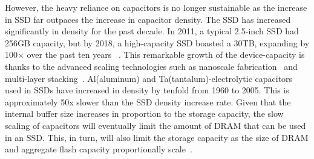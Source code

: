 
However, the heavy reliance on capacitors is no longer sustainable as the increase in SSD far outpaces 
the increase in capacitor density.
The SSD has increased significantly in density for the past decade. 
In 2011, a typical 2.5-inch SSD had 256GB capacity, but
by 2018, a high-capacity SSD boasted a 30TB, expanding by 100× over the past ten years
~\cite{samsung2011, anandtech18samsung}. 
This remarkable growth of the device-capacity is thanks to the advanced scaling technologies 
such as nanoscale fabrication~\cite{busche2014design} and multi-layer stacking~\cite{9365809}. 
Al(aluminum) and Ta(tantalum)-electrolytic capacitors used in SSDs 
have increased in density by tenfold from 1960 to 2005. 
This is approximately 50x slower than the SSD density increase rate.
Given that the internal buffer size increases in proportion to the storage capacity,
the slow scaling of capacitors will eventually limit the amount of DRAM that can be used in an SSD. 
This, in turn, will also limit the storage capacity as the size of DRAM and aggregate flash capacity proportionally scale~\cite{samsung_ratio, ni2017hash}. 

\iffalse
the density gap between capacitance and memory technologies 
imposes an intrinsic limitation on the current architecture wherein 
the entire buffer is fully protected by capacitors. 
\fi

